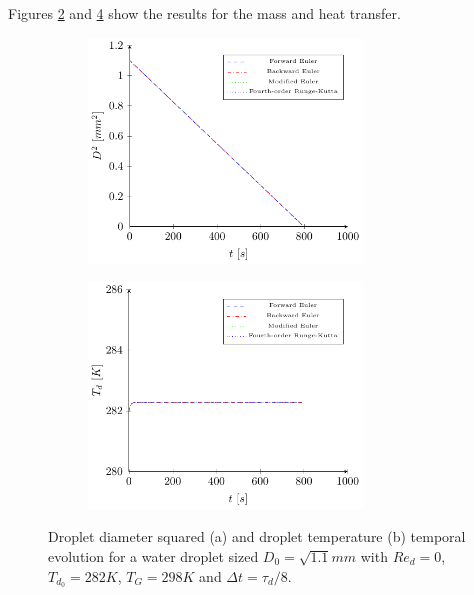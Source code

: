 \documentclass[../Interim_Report_Master]{subfiles}
\begin{document}
Figures \ref{coupled_d2_tau_8} and \ref{coupled_heat_tau_8} show the results for the mass and heat transfer.
\begin{figure}[H]
	\centering
	\begin{subfigure}{\textwidth}
		\centering
		\includegraphics[width=0.8\textwidth]{./Diagrams/Coupled_Heat_Mass_Transfer_tau_8/Coupled_d2_Transfer_tau_8.pdf}
		\caption{}
		\label{coupled_d2_tau_8}
	\end{subfigure}
\end{figure}
\begin{figure}\ContinuedFloat
	\centering
	\begin{subfigure}{\textwidth}
		\centering
		\includegraphics[width=0.8\textwidth]{./Diagrams/Coupled_Heat_Mass_Transfer_tau_8/Coupled_Heat_Transfer_tau_8.pdf}
		\caption{}
		\label{coupled_heat_tau_8}
	\end{subfigure}
	\caption{Droplet diameter squared (a) and droplet temperature (b) temporal evolution for a water droplet sized $D_0=\sqrt{1.1}mm$ with $Re_d=0$, $T_{d_0}=282K$, $T_G=298K$ and $\Delta t=\tau_d/8$.}
\end{figure}
\end{document}
